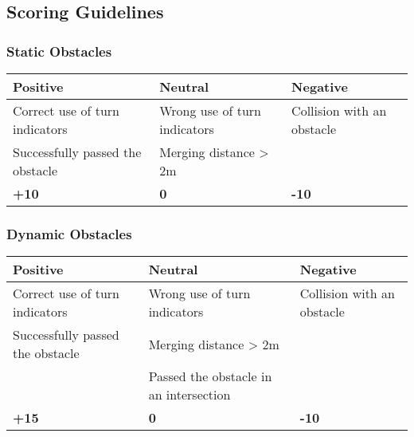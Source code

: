 {	\newpage

	\subsection{Scoring Guidelines}
	\label{obstacle_scoring_guidelines}

	\subsubsection*{Static Obstacles}
	\begin{table}[H]
		\begin{tabularx}{\textwidth}{XXX}
			\toprule
			\textbf{Positive}                & \textbf{Neutral}             & \textbf{Negative}          \\
			\midrule
			Correct use of turn indicators   & Wrong use of turn indicators & Collision with an obstacle \\
			Successfully passed the obstacle & Merging distance > 2m        &                            \\
			\topstrut
			\textbf{+10}                     & \textbf{0}                   & \textbf{-10}               \\
			\bottomrule
		\end{tabularx}
	\end{table}

	\subsubsection*{Dynamic Obstacles}
	\begin{table}[H]
		\begin{tabularx}{\textwidth}{XXX}
			\toprule
			\textbf{Positive}                & \textbf{Neutral}                        & \textbf{Negative}          \\
			\midrule
			Correct use of turn indicators   & Wrong use of turn indicators            & Collision with an obstacle \\
			Successfully passed the obstacle & Merging distance > 2m                   &                            \\
			                                 & Passed the obstacle in an intersection  &                            \\
			\topstrut
			\textbf{+15}                     & \textbf{0}                              & \textbf{-10}               \\
			\bottomrule
		\end{tabularx}
	\end{table}

}

